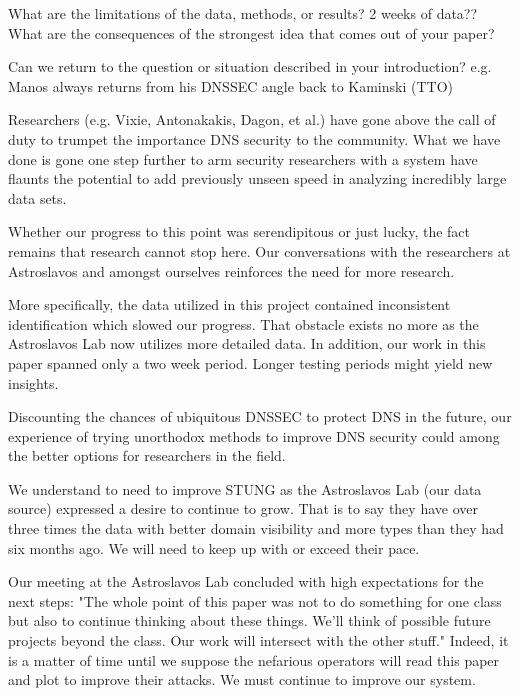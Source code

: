 \documentclass{acm_proc_article-sp}
\begin{document}
What are the limitations of the data, methods, or results? 2 weeks of data??
What are the consequences of the strongest idea that comes out of your paper?

Can we return to the question or situation described in your introduction? e.g. Manos always returns from his DNSSEC angle back to Kaminski
(TTO)

 
 
Researchers (e.g. Vixie, Antonakakis, Dagon, et al.) have gone above the call of duty to trumpet the importance DNS security to the community.\cite{LectureB}  What we have done is gone one step further to arm security researchers with a system have flaunts the potential to add previously unseen speed in analyzing incredibly large data sets.

Whether our progress to this point was serendipitous or just lucky, the fact remains that research cannot stop here.  Our conversations with the researchers at Astroslavos and amongst ourselves reinforces the need for more research.

More specifically, the data utilized in this project contained inconsistent identification which slowed our progress.  That obstacle exists no more as the Astroslavos Lab now utilizes more detailed data.  In addition, our work in this paper spanned only a two week period.  Longer testing periods might yield new insights.

Discounting the chances of ubiquitous DNSSEC to protect DNS in the future, our experience of trying unorthodox methods to improve DNS security could among the better options for researchers in the field. 

We understand to need to improve STUNG as the Astroslavos Lab (our data source) expressed a desire to continue to grow.  That is to say they have over three times the data with better domain visibility and more types than they had six months ago.  We will need to keep up with or exceed their pace.   

Our meeting at the Astroslavos Lab concluded with high expectations for the next steps: "The whole point of this paper was not to do something for one class but also to continue thinking about these things.  We'll think of possible future projects beyond the class.  Our work will intersect with the other stuff."  Indeed, it is a matter of time until we suppose the nefarious operators will read this paper and plot to improve their attacks.  We must continue to improve our system.
\end{document}
